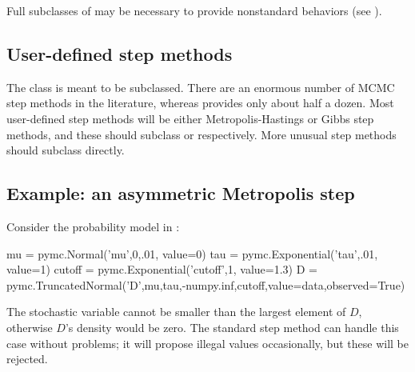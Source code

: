 \documentclass[]{jss}
\begin{document}
Full subclasses of  may be necessary to provide nonstandard behaviors (see ).


\subsection{User-defined step methods} \label{custom-stepper}

The  class is meant to be subclassed. There are an enormous number of MCMC step methods in the literature, whereas  provides only about half a dozen. Most user-defined step methods will be either Metropolis-Hastings or Gibbs step methods, and these should subclass  or  respectively. More unusual step methods should subclass  directly.


\subsection{Example: an asymmetric Metropolis step} \label{user-gen}
Consider the probability model in :
\begin{CodeInput}
mu = pymc.Normal('mu',0,.01, value=0)
tau = pymc.Exponential('tau',.01, value=1)
cutoff = pymc.Exponential('cutoff',1, value=1.3)
D = pymc.TruncatedNormal('D',mu,tau,-numpy.inf,cutoff,value=data,observed=True)
\end{CodeInput}
The stochastic variable  cannot be smaller than the largest element of $D$, otherwise $D$'s density would be zero. The standard  step method can handle this case without problems; it will propose illegal values occasionally, but these will be rejected.
\end{document}
